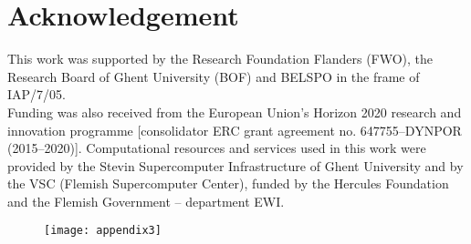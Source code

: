 \renewcommand\evenpagerightmark{{\scshape\small Acknowledgement}}
\chapter{Acknowledgement}


This work was supported by the Research Foundation Flanders
(FWO), the Research Board of Ghent University (BOF) and
BELSPO in the frame of IAP/7/05.\\
Funding
was also received from the European Union's Horizon 2020
research and innovation programme [consolidator ERC grant
agreement no. 647755--DYNPOR (2015--2020)].
\npar
\noindent Computational resources and services used in this work were provided
by the Stevin Supercomputer Infrastructure of Ghent University and by the VSC (Flemish Supercomputer
Center), funded by the Hercules Foundation and the Flemish Government
-- department EWI.

\begin{figure}[!h]
	\centering
	\texttt{[image: appendix3]}
		\label{fig:appendix3}
\end{figure}